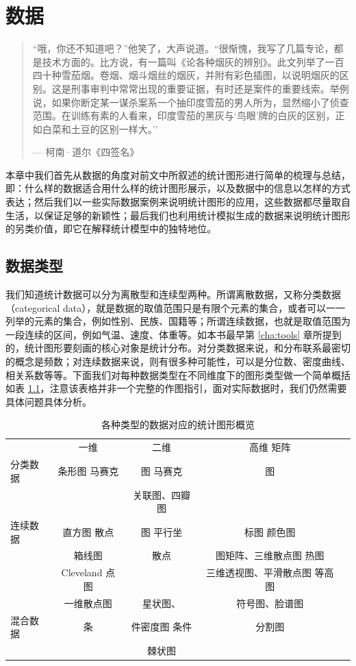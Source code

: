 \documentclass[
  b5paper,
  UTF8,twoside]{book}
\begin{document}
\hypertarget{chap:data}{%
\chapter{数据}\label{chap:data}}

\begin{quote}
``哦，你还不知道吧？''他笑了，大声说道。``很惭愧，我写了几篇专论，都是技术方面的。比方说，有一篇叫《论各种烟灰的辨别》。此文列举了一百四十种雪茄烟。卷烟、烟斗烟丝的烟灰，并附有彩色插图，以说明烟灰的区别。这是刑事审判中常常出现的重要证据，有时还是案件的重要线索。举例说，如果你断定某一谋杀案系一个抽印度雪茄的男人所为，显然缩小了侦查范围。在训练有素的人看来，印度雪茄的黑灰与`鸟眼'牌的白灰的区别，正如白菜和土豆的区别一样大。''

\hspace*{\fill} --- 柯南·道尔《四签名》
\end{quote}

本章中我们首先从数据的角度对前文中所叙述的统计图形进行简单的梳理与总结，即：什么样的数据适合用什么样的统计图形展示，以及数据中的信息以怎样的方式表达；然后我们以一些实际数据案例来说明统计图形的应用，这些数据都尽量取自生活，以保证足够的新颖性；最后我们也利用统计模拟生成的数据来说明统计图形的另类价值，即它在解释统计模型中的独特地位。

\hypertarget{sec:data-type}{%
\section{数据类型}\label{sec:data-type}}

我们知道统计数据可以分为离散型和连续型两种。所谓离散数据，又称分类数据（categorical data），就是数据的取值范围只是有限个元素的集合，或者可以一一列举的元素的集合，例如性别、民族、国籍等；所谓连续数据，也就是取值范围为一段连续的区间，例如气温、速度、体重等。如本书最早第 \ref{cha:tools} 章所提到的，统计图形要刻画的核心对象是统计分布。对分类数据来说，和分布联系最密切的概念是频数；对连续数据来说，则有很多种可能性，可以是分位数、密度曲线、相关系数等等。下面我们对每种数据类型在不同维度下的图形类型做一个简单概括如表 \ref{tab:plot-summary}，注意该表格并非一个完整的作图指引，面对实际数据时，我们仍然需要具体问题具体分析。

\begin{longtable}[]{@{}lcccl@{}}
\caption{\label{tab:plot-summary} 各种类型的数据对应的统计图形概览}\tabularnewline
\toprule
\endhead
& 一维 & 二维 & 高维 矩阵 & \\
分类数据 & 条形图 马赛克 & 图 马赛克 & 图 & \\
& & 关联图、四瓣图 & & \\
连续数据 & 直方图 散点 & 图 平行坐 & 标图 颜色图 & \\
& 箱线图 & 散点 & 图矩阵、三维散点图 热图 & \\
& Cleveland 点图 & & 三维透视图、平滑散点图 等高图 & \\
& 一维散点图 & 星状图、 & 符号图、脸谱图 & \\
混合数据 & 条 & 件密度图 条件 & 分割图 & \\
& & 棘状图 & & \\
\bottomrule
\end{longtable}
\end{document}
